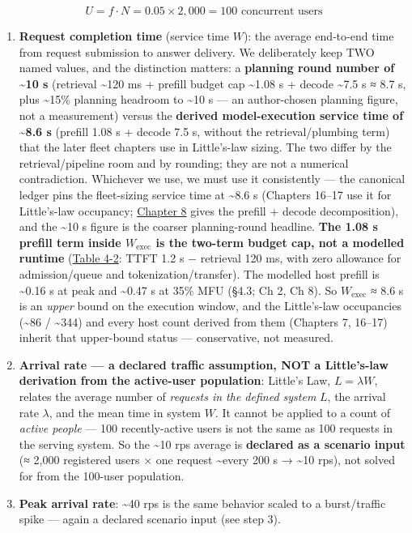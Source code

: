 \[
U = f \cdot N = 0.05 \times 2{,}000 = 100 \text{ concurrent users}
\]

\begin{enumerate}
\def\labelenumi{\arabic{enumi}.}
\setcounter{enumi}{1}
\item
  \textbf{Request completion time} (service time \(W\)): the average
  end‑to‑end time from request submission to answer delivery. We
  deliberately keep TWO named values, and the distinction matters: a
  \textbf{planning round number of \textasciitilde10 s} (retrieval
  \textasciitilde120 ms + prefill budget cap \textasciitilde1.08 s +
  decode \textasciitilde7.5 s ≈ 8.7 s, plus \textasciitilde15\% planning
  headroom to \textasciitilde10 s --- an author-chosen planning figure,
  not a measurement) versus the \textbf{derived model-execution service
  time of \textasciitilde8.6 s} (prefill 1.08 s + decode 7.5 s, without
  the retrieval/plumbing term) that the later fleet chapters use in
  Little's-law sizing. The two differ by the retrieval/pipeline room and
  by rounding; they are not a numerical contradiction. Whichever we use,
  we must use it consistently --- the canonical ledger pins the
  fleet-sizing service time at \textasciitilde8.6 s (Chapters 16--17 use
  it for Little's-law occupancy; \hyperref[chap:8]{Chapter 8} gives the prefill + decode
  decomposition), and the \textasciitilde10 s figure is the coarser
  planning-round headline. \textbf{The 1.08 s prefill term inside
  \(W_{\mathrm{exec}}\) is the two-term budget cap, not a modelled
  runtime} (\hyperref[tab:4.2]{Table 4-2}: TTFT 1.2 s − retrieval 120 ms, with zero
  allowance for admission/queue and tokenization/transfer). The modelled
  host prefill is \textasciitilde0.16 s at peak and \textasciitilde0.47
  s at 35\% MFU (§4.3; Ch 2, Ch 8). So \(W_{\mathrm{exec}}\) ≈ 8.6 s is
  an \emph{upper} bound on the execution window, and the Little's-law
  occupancies (\textasciitilde86 / \textasciitilde344) and every host
  count derived from them (Chapters 7, 16--17) inherit that upper-bound
  status --- conservative, not measured.
\item
  \textbf{Arrival rate --- a declared traffic assumption, NOT a
  Little's-law derivation from the active-user population}: Little's
  Law, \(L = \lambda W\), relates the average number of \emph{requests
  in the defined system} \(L\), the arrival rate \(\lambda\), and the
  mean time in system \(W\). It cannot be applied to a count of
  \emph{active people} --- 100 recently-active users is not the same as
  100 requests in the serving system. So the \textasciitilde10 rps
  average is \textbf{declared as a scenario input} (≈ 2,000 registered
  users × one request \textasciitilde every 200 s → \textasciitilde10
  rps), not solved for from the 100-user population.
\item
  \textbf{Peak arrival rate}: \textasciitilde40 rps is the same behavior
  scaled to a burst/traffic spike --- again a declared scenario input
  (see step 3).
\end{enumerate}

